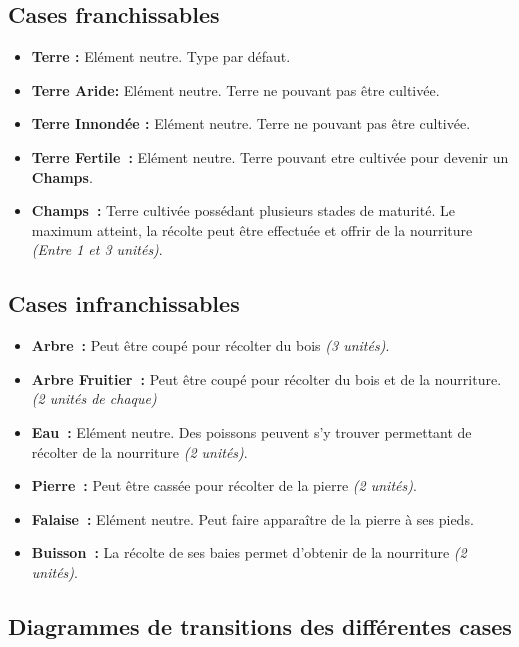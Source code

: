 \documentclass[a4paper]{article}
\begin{document}
      \subsection{Cases franchissables}
        \begin{itemize}
          \item \textbf{Terre :} \small{ Elément neutre. Type par défaut.}
          \item \textbf{Terre Aride:} \small{ Elément neutre. Terre ne pouvant pas être cultivée.}
          \item \textbf{Terre Innondée :} \small{ Elément neutre. Terre ne pouvant pas être cultivée.}
          \item \textbf{Terre Fertile :} \small{ Elément neutre. Terre pouvant etre cultivée pour devenir un \textbf{Champs}.}
          \item \textbf{Champs :} \small{ Terre cultivée possédant plusieurs stades de maturité. Le maximum atteint, la récolte peut être effectuée et offrir de la nourriture \textit{(Entre 1 et 3 unités)}.}
        \end{itemize}

      \subsection{Cases infranchissables}
        \begin{itemize}
          \item \textbf{Arbre :} \small{ Peut être coupé pour récolter du bois \textit{(3 unités)}.}
          \item \textbf{Arbre Fruitier :} \small{ Peut être coupé pour récolter du bois et de la nourriture. \textit{(2 unités de chaque)}}
          \item \textbf{Eau :} \small{ Elément neutre. Des poissons peuvent s'y trouver permettant de récolter de la nourriture \textit{(2 unités)}.}
          \item \textbf{Pierre :} \small{ Peut être cassée pour récolter de la pierre \textit{(2 unités)}.}
          \item \textbf{Falaise :} \small{ Elément neutre. Peut faire apparaître de la pierre à ses pieds.}
          \item \textbf{Buisson :} \small{ La récolte de ses baies permet d'obtenir de la nourriture \textit{(2 unités)}.}
        \end{itemize}

      \subsection{Diagrammes de transitions des différentes cases}
\end{document}
